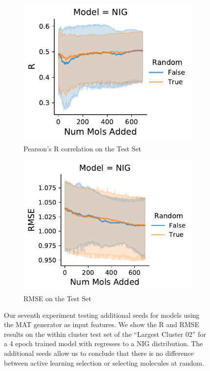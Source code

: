\documentclass[journal=jmcmar,manuscript=article]{achemso}
\begin{document}
\begin{figure}[tbph]
    \centering
    \begin{subfigure}[b]{0.48\textwidth}
        \includegraphics[width=1\linewidth]{figures/fig7_expanded_MAT_R.pdf}
        \caption{Pearson's R correlation on the Test Set}
    \end{subfigure}%
    \hfill
    \begin{subfigure}[b]{0.48\textwidth}
        \includegraphics[width=1\linewidth]{figures/fig7_expanded_MAT_RMSE.pdf}
        \caption{RMSE on the Test Set}
    \end{subfigure}
    \caption{Our seventh experiment testing additional seeds for models using the MAT generator as input features. We show the R and RMSE results on the within cluster test set of the ``Largest Cluster 02'' for a 4 epoch trained model with regresses to a NIG distribution. The additional seeds allow us to conclude that there is no difference between active learning selection or selecting molecules at random.}
    \label{fig:expandedMAT}
\end{figure}
\end{document}
